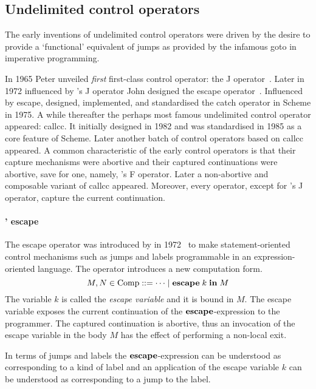 \documentclass[12pt,phd,lfcs,twoside,openright,logo,leftchapter,normalheadings]{infthesis}
\theoremstyle{plain}
\theoremstyle{definition}
\begin{document}
\subsection{Undelimited control operators}
%
The early inventions of undelimited control operators were driven by
the desire to provide a `functional' equivalent of jumps as provided
by the infamous goto in imperative programming.
%

In 1965 Peter \citeauthor{Landin65} unveiled \emph{first} first-class
control operator: the J
operator~\cite{Landin65,Landin65a,Landin98}. Later in 1972 influenced
by \citeauthor{Landin65}'s J operator John \citeauthor{Reynolds98a}
designed the escape operator~\cite{Reynolds98a}. Influenced by escape,
\citeauthor{SussmanS75} designed, implemented, and standardised the
catch operator in Scheme in 1975. A while thereafter the perhaps most
famous undelimited control operator appeared: callcc. It initially
designed in 1982 and was standardised in 1985 as a core feature of
Scheme. Later another batch of control operators based on callcc
appeared. A common characteristic of the early control operators is
that their capture mechanisms were abortive and their captured
continuations were abortive, save for one, namely,
\citeauthor{Felleisen88}'s F operator. Later a non-abortive and
composable variant of callcc appeared. Moreover, every operator,
except for \citeauthor{Landin98}'s J operator, capture the current
continuation.

\paragraph{\citeauthor{Reynolds98a}' escape} The escape operator was introduced by
\citeauthor{Reynolds98a} in 1972~\cite{Reynolds98a} to make
statement-oriented control mechanisms such as jumps and labels
programmable in an expression-oriented language.
%
The operator introduces a new computation form.
%
\[
  M, N \in \textrm{Comp} ::= \cdots \mid \mathbf{escape}\;k\;\mathbf{in}\;M
\]
%
The variable $k$ is called the \emph{escape variable} and it is bound
in $M$. The escape variable exposes the current continuation of the
$\mathbf{escape}$-expression to the programmer. The captured continuation is
abortive, thus an invocation of the escape variable in the body $M$
has the effect of performing a non-local exit.
%

In terms of jumps and labels the $\mathbf{escape}$-expression can be
understood as corresponding to a kind of label and an application of
the escape variable $k$ can be understood as corresponding to a jump
to the label.
\end{document}
